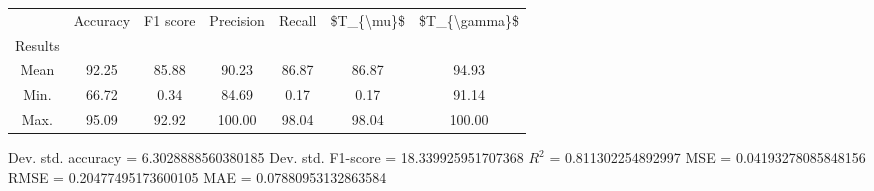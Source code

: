 \begin{tabular}{|c|c|c|c|c|c|c|}
\toprule
{} &  Accuracy &  F1 score &  Precision &  Recall &  \$T\_\{\textbackslash mu\}\$ &  \$T\_\{\textbackslash gamma\}\$ \\
Results &           &           &            &         &            &               \\
\hline
Mean    &     92.25 &     85.88 &      90.23 &   86.87 &      86.87 &         94.93 \\
Min.    &     66.72 &      0.34 &      84.69 &    0.17 &       0.17 &         91.14 \\
Max.    &     95.09 &     92.92 &     100.00 &   98.04 &      98.04 &        100.00 \\
\bottomrule
\end{tabular}

 Dev. std. accuracy = 6.3028888560380185
 Dev. std. F1-score = 18.339925951707368
 $R^2$ = 0.811302254892997
 MSE = 0.04193278085848156
 RMSE = 0.20477495173600105
 MAE = 0.07880953132863584